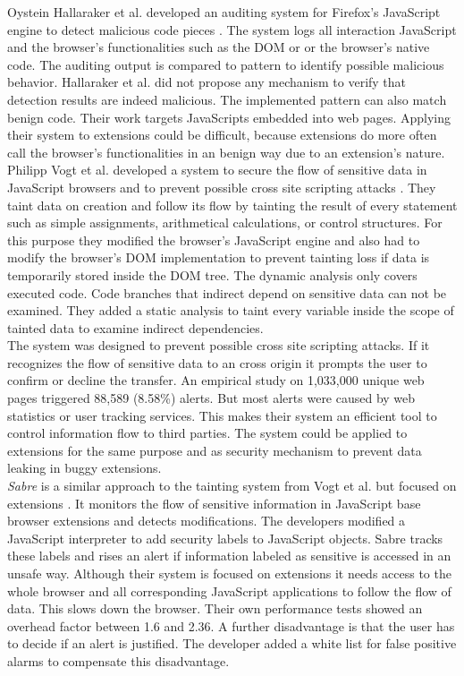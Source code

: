 \documentclass[article,colorback,accentcolor=tud9c,type=bsc]{tudthesis}
\begin{document}
	Oystein Hallaraker et al. developed an auditing system for Firefox's JavaScript engine to detect malicious code pieces \cite{Hallaraker:2005:DMJ:1078029.1078861}. The system logs all interaction JavaScript and the browser's functionalities such as the DOM or or the browser's native code. The auditing output is compared to pattern to identify possible malicious behavior. Hallaraker et al. did not propose any mechanism to verify that detection results are indeed malicious. The implemented pattern can also match benign code. Their work targets JavaScripts embedded into web pages. Applying their system to extensions could be difficult, because extensions do more often call the browser's functionalities in an benign way due to an extension's nature. \\

	Philipp Vogt et al. developed a system to secure the flow of sensitive data in JavaScript browsers and to prevent possible cross site scripting attacks \cite{ndss2007xss} . They taint data on creation and follow its flow by tainting the result of every statement such as simple assignments, arithmetical calculations, or control structures. For this purpose they modified the browser's JavaScript engine and also had to modify the browser's DOM implementation to prevent tainting loss if data is temporarily stored inside the DOM tree. The dynamic analysis only covers executed code. Code branches that indirect depend on sensitive data can not be examined. They added a static analysis to taint every variable inside the scope of tainted data to examine indirect dependencies. \\
	The system was designed to prevent possible cross site scripting attacks. If it recognizes the flow of sensitive data to an cross origin it prompts the user to confirm or decline the transfer. An empirical study on 1,033,000 unique web pages triggered 88,589 (8.58\%) alerts. But most alerts were caused by web statistics or user tracking services. This makes their system an efficient tool to control information flow to third parties. The system could be applied to extensions for the same purpose and as security mechanism to prevent data leaking in buggy extensions. \\
	
	\textit{Sabre} is a similar approach to the tainting system from Vogt et al. but focused on extensions \cite{Dhawan:2009:AIF:1723192.1723250, ndss2007xss}. It monitors the flow of sensitive information in JavaScript base browser extensions and detects modifications. The developers modified a JavaScript interpreter to add security labels to JavaScript objects. Sabre tracks these labels and rises an alert if information labeled as sensitive is accessed in an unsafe way. Although their system is focused on extensions it needs access to the whole browser and all corresponding JavaScript applications to follow the flow of data. This slows down the browser. Their own performance tests showed an overhead factor between 1.6 and 2.36. A further disadvantage is that the user has to decide if an alert is justified. The developer added a white list for false positive alarms to compensate this disadvantage.  
		
\end{document}

